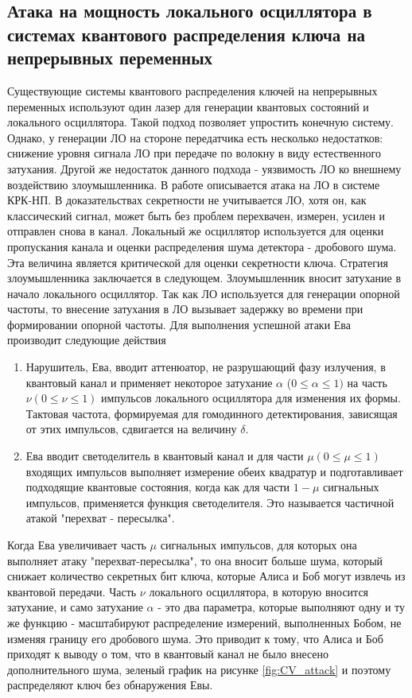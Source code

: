 \subsection{Атака на мощность локального осциллятора в системах квантового распределения ключа на непрерывных переменных}\label{sec:ch1/sect7/subsec2}
Существующие системы квантового распределения ключей на непрерывных переменных используют один лазер для генерации квантовых состояний и локального осциллятора. Такой подход позволяет упростить конечную систему. 
Однако, у генерации ЛО на стороне передатчика есть несколько недостатков: снижение уровня сигнала ЛО при передаче по волокну в виду естественного затухания. Другой же недостаток данного подхода - уязвимость ЛО ко внешнему воздействию злоумышленника.
В работе \cite{jouguet2013, fan2023} описывается атака на ЛО в системе КРК-НП. В доказательствах секретности не учитывается ЛО, хотя он, как классический сигнал, может быть без проблем перехвачен, измерен, усилен и отправлен снова в канал.
Локальный же осциллятор используется для оценки пропускания канала и оценки распределения шума детектора - дробового шума. Эта величина является критической для оценки секретности ключа. 
Стратегия злоумышленника заключается в следующем. Злоумышленник вносит затухание в начало локального осциллятор. Так как ЛО используется для генерации опорной частоты, то внесение затухания в ЛО вызывает задержку во времени при формировании опорной частоты.
Для выполнения успешной атаки Ева производит следующие действия
\begin{enumerate}
    \item Нарушитель, Ева, вводит аттенюатор, не разрушающий фазу излучения, в квантовый канал и применяет некоторое затухание $\alpha$ ($0\leq \alpha \leq 1)$ на часть $\nu (0 \leq \nu \leq 1)$ импульсов локального осциллятора для изменения их формы. Тактовая частота, формируемая для гомодинного детектирования, зависящая от этих импульсов, сдвигается на величину $\delta$.
    \item Ева вводит светоделитель в квантовый канал и для части $\mu (0 \leq \mu \leq 1)$ входящих импульсов выполняет измерение обеих квадратур и подготавливает подходящие квантовые состояния, когда как для части $1 -\mu$ сигнальных импульсов, применяется функция светоделителя. Это называется частичной атакой "перехват - пересылка". 
\end{enumerate} 
Когда Ева увеличивает часть $\mu$ сигнальных импульсов, для которых она выполняет атаку "перехват-пересылка", то она вносит больше шума, который снижает количество секретных бит ключа, которые Алиса и Боб могут извлечь из квантовой передачи.
Часть $\nu$ локального осциллятора, в которую вносится затухание, и само затухание $\alpha$ - это два параметра, которые выполняют одну и ту же функцию - масштабируют распределение измерений, выполненных Бобом, не изменяя границу его дробового шума. Это приводит к тому, что Алиса и Боб приходят к выводу о том, что в квантовый канал не было внесено дополнительного шума, зеленый график на рисунке \ref*{fig:CV_attack} и поэтому распределяют ключ без обнаружения Евы.

